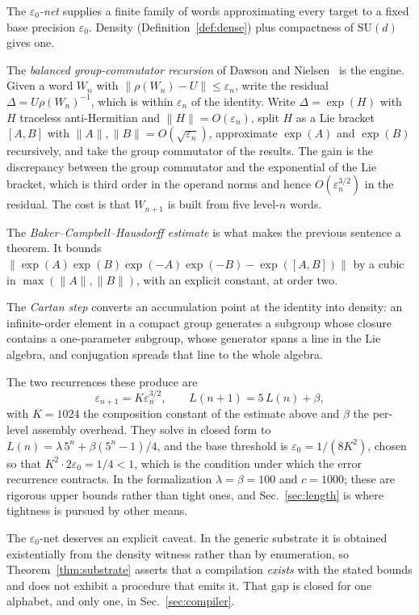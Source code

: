 \documentclass[aps,pra,reprint,nofootinbib,superscriptaddress]{revtex4-2}
\newcommand{\su}[1]{\mathrm{SU}(#1)}
\newcommand{\opn}[1]{\lVert #1 \rVert}
\theoremstyle{plain}
\theoremstyle{definition}
\begin{document}
The \emph{$\varepsilon_0$-net} supplies a finite family of words approximating
every target to a fixed base precision $\varepsilon_0$. Density
(Definition~\ref{def:dense}) plus compactness of $\su d$ gives one.

The \emph{balanced group-commutator recursion} of Dawson and
Nielsen~\cite{DawsonNielsen2006} is the engine. Given a word $W_n$ with
$\opn{\rho(W_n) - U} \le \varepsilon_n$, write the residual
$\Delta = U\rho(W_n)^{-1}$, which is within $\varepsilon_n$ of the identity.
Write $\Delta = \exp(H)$ with $H$ traceless anti-Hermitian and
$\opn{H} = O(\varepsilon_n)$, split $H$ as a Lie bracket $[A,B]$ with
$\opn{A},\opn{B} = O(\sqrt{\varepsilon_n})$, approximate $\exp(A)$ and
$\exp(B)$ recursively, and take the group commutator of the results. The gain
is the discrepancy between the group commutator and the exponential of the Lie
bracket, which is third order in the operand norms and hence
$O(\varepsilon_n^{3/2})$ in the residual. The cost is that $W_{n+1}$ is built
from five level-$n$ words.

The \emph{Baker--Campbell--Hausdorff estimate} is what makes the previous
sentence a theorem. It bounds
$\opn{\exp(A)\exp(B)\exp(-A)\exp(-B) - \exp([A,B])}$ by a cubic in
$\max(\opn A, \opn B)$, with an explicit constant, at order two.

The \emph{Cartan step} converts an accumulation point at the identity into
density: an infinite-order element in a compact group generates a subgroup
whose closure contains a one-parameter subgroup, whose generator spans a line
in the Lie algebra, and conjugation spreads that line to the whole algebra.

The two recurrences these produce are
\[
  \varepsilon_{n+1} = K\varepsilon_n^{3/2},
  \qquad
  L(n+1) = 5\,L(n) + \beta ,
\]
with $K = 1024$ the composition constant of the estimate above and $\beta$ the
per-level assembly overhead. They solve in closed form to
$L(n) = \lambda\,5^n + \beta(5^n - 1)/4$, and the base threshold is
$\varepsilon_0 = 1/(8K^2)$, chosen so that $K^2 \cdot 2\varepsilon_0 = 1/4 < 1$,
which is the condition under which the error recurrence contracts. In the
formalization $\lambda = \beta = 100$ and $c = 1000$; these are rigorous upper
bounds rather than tight ones, and Sec.~\ref{sec:length} is where tightness is
pursued by other means.

The $\varepsilon_0$-net deserves an explicit caveat. In the generic substrate it
is obtained existentially from the density witness rather than by enumeration,
so Theorem~\ref{thm:substrate} asserts that a compilation \emph{exists} with the
stated bounds and does not exhibit a procedure that emits it. That gap is closed
for one alphabet, and only one, in Sec.~\ref{sec:compiler}.
\end{document}
